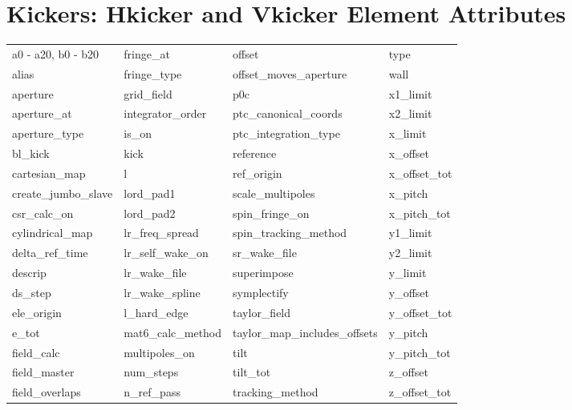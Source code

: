  \section{Kickers: Hkicker and Vkicker Element Attributes}
 \label{s:list.hvkicker}
 
 \begin{tabular}{llll} \toprule
a0 - a20, b0 - b20          & fringe_at                   & offset                      & type                        \\
alias                       & fringe_type                 & offset_moves_aperture       & wall                        \\
aperture                    & grid_field                  & p0c                         & x1_limit                    \\
aperture_at                 & integrator_order            & ptc_canonical_coords        & x2_limit                    \\
aperture_type               & is_on                       & ptc_integration_type        & x_limit                     \\
bl_kick                     & kick                        & reference                   & x_offset                    \\
cartesian_map               & l                           & ref_origin                  & x_offset_tot                \\
create_jumbo_slave          & lord_pad1                   & scale_multipoles            & x_pitch                     \\
csr_calc_on                 & lord_pad2                   & spin_fringe_on              & x_pitch_tot                 \\
cylindrical_map             & lr_freq_spread              & spin_tracking_method        & y1_limit                    \\
delta_ref_time              & lr_self_wake_on             & sr_wake_file                & y2_limit                    \\
descrip                     & lr_wake_file                & superimpose                 & y_limit                     \\
ds_step                     & lr_wake_spline              & symplectify                 & y_offset                    \\
ele_origin                  & l_hard_edge                 & taylor_field                & y_offset_tot                \\
e_tot                       & mat6_calc_method            & taylor_map_includes_offsets & y_pitch                     \\
field_calc                  & multipoles_on               & tilt                        & y_pitch_tot                 \\
field_master                & num_steps                   & tilt_tot                    & z_offset                    \\
field_overlaps              & n_ref_pass                  & tracking_method             & z_offset_tot                \\
 \bottomrule
 \end{tabular}
